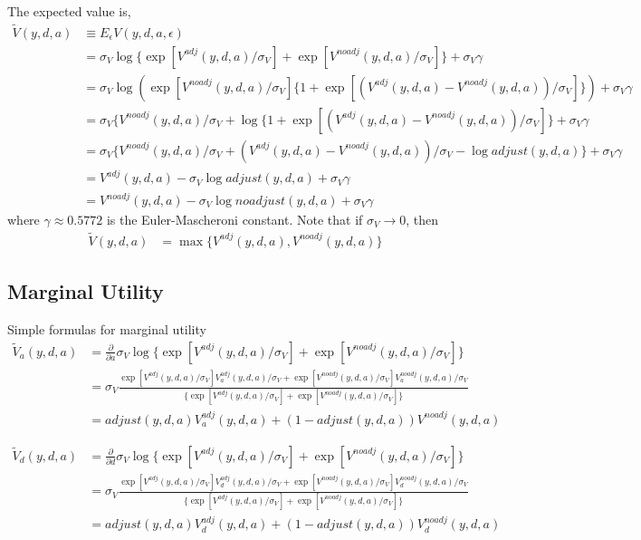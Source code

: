 \documentclass[11pt]{article}
\begin{document}
The expected value is,
\begin{align*}
    \tilde{V}(y,d,a) &\equiv E_{\epsilon} V(y,d,a,\epsilon) \\
    &=\sigma_V\log\{\exp[ V^{adj}(y,d,a)/\sigma_V]+\exp[V^{noadj}(y,d,a)/\sigma_V]\} + \sigma_V\gamma \\
    &=\sigma_V\log (\exp[ V^{noadj}(y,d,a)/\sigma_V]\{1+\exp[(V^{adj}(y,d,a)-V^{noadj}(y,d,a))/\sigma_V]\}) + \sigma_V\gamma \\
    &=\sigma_V\{ V^{noadj}(y,d,a)/\sigma_V + \log\{1+\exp[(V^{adj}(y,d,a)-V^{noadj}(y,d,a))/\sigma_V]\} + \sigma_V\gamma \\
    &=\sigma_V\{ V^{noadj}(y,d,a)/\sigma_V + (V^{adj}(y,d,a)-V^{noadj}(y,d,a))/\sigma_V - \log adjust(y,d,a) \} + \sigma_V\gamma\\
    &=V^{adj}(y,d,a) - \sigma_V  \log adjust(y,d,a) + \sigma_V\gamma \\
    &=V^{noadj}(y,d,a) - \sigma_V  \log noadjust(y,d,a) + \sigma_V\gamma 
\end{align*}
where $\gamma\approx 0.5772$ is the Euler-Mascheroni constant. Note that if $\sigma_V\rightarrow0$, then
\begin{align*}
    \tilde{V}(y,d,a) &= \max\{V^{adj}(y,d,a), V^{noadj}(y,d,a) \} 
\end{align*}

\subsection{Marginal Utility}

Simple formulas for marginal utility
\begin{align*}
    \tilde{V}_a(y,d,a) &= \frac{\partial}{\partial a} \sigma_V\log\{\exp[ V^{adj}(y,d,a)/\sigma_V]+\exp[V^{noadj}(y,d,a)/\sigma_V]\}  \\
    &=  \sigma_V\frac{\exp[ V^{adj}(y,d,a)/\sigma_V]V_a^{adj}(y,d,a)/\sigma_V + \exp[ V^{noadj}(y,d,a)/\sigma_V]V_a^{noadj}(y,d,a)/\sigma_V}{\{\exp[ V^{adj}(y,d,a)/\sigma_V]+\exp[V^{noadj}(y,d,a)/\sigma_V]\}}  \\
    &= adjust(y,d,a) V_a^{adj}(y,d,a) + (1-adjust(y,d,a)) V^{noadj}(y,d,a)   
\end{align*}

\begin{align*}
    \tilde{V}_d(y,d,a) &= \frac{\partial}{\partial d} \sigma_V\log\{\exp[ V^{adj}(y,d,a)/\sigma_V]+\exp[V^{noadj}(y,d,a)/\sigma_V]\}  \\
    &=  \sigma_V\frac{\exp[ V^{adj}(y,d,a)/\sigma_V]V_d^{adj}(y,d,a)/\sigma_V + \exp[ V^{noadj}(y,d,a)/\sigma_V]V_d^{noadj}(y,d,a)/\sigma_V}{\{\exp[ V^{adj}(y,d,a)/\sigma_V]+\exp[V^{noadj}(y,d,a)/\sigma_V]\}}  \\
    &= adjust(y,d,a) V_d^{adj}(y,d,a) + (1-adjust(y,d,a)) V_d^{noadj}(y,d,a)   
\end{align*}
\end{document}
